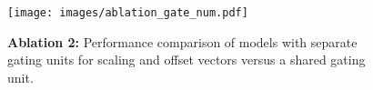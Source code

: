 \begin{figure}[!ht]
    \centering
    \texttt{[image: images/ablation\_gate\_num.pdf]}
    \caption{\label{fig:gate_num}
    \textbf{Ablation 2:} Performance comparison of models with separate gating units for scaling and offset vectors versus a shared gating unit.
    }
\end{figure}